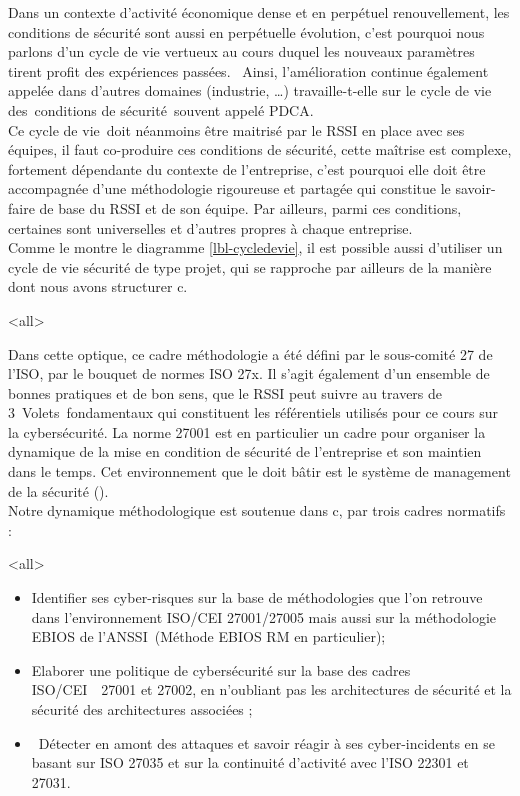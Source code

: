 Dans un contexte d'activité économique dense et en perpétuel renouvellement, les conditions de sécurité sont aussi en perpétuelle évolution, c’est pourquoi nous parlons d'un cycle de vie vertueux au cours duquel les nouveaux paramètres tirent profit des expériences passées.  Ainsi, l’amélioration continue également appelée  dans d’autres domaines (industrie, …) travaille-t-elle sur le cycle de vie des conditions de sécurité souvent appelé \gls{PDCA}.\\
Ce cycle de vie doit néanmoins être maitrisé par le RSSI en place avec ses équipes, il faut co-produire ces conditions de sécurité, cette maîtrise est complexe, fortement dépendante du contexte de l'entreprise, c’est pourquoi elle doit être accompagnée d'une méthodologie rigoureuse et partagée qui constitue le savoir-faire de base du RSSI et de son équipe. Par ailleurs, parmi ces conditions, certaines sont universelles et d’autres propres à chaque entreprise. \\ Comme le montre le diagramme \ref{lbl-cycledevie}, il est possible aussi d’utiliser un cycle de vie sécurité de type projet, qui se rapproche par ailleurs de la manière dont nous avons structurer c\edoc. 

\mode<all>{}


Dans cette optique, ce cadre méthodologie a été défini par le sous-comité 27 de l'ISO, par le bouquet de normes ISO 27x. Il s’agit également d'un ensemble de bonnes pratiques et de bon sens, que le RSSI peut suivre au travers de 3 Volets fondamentaux qui constituent les référentiels utilisés pour ce cours sur la cybersécurité. La norme 27001 est en particulier un cadre pour organiser la dynamique de la mise en condition de sécurité de l’entreprise et son maintien dans le temps. Cet environnement que le  doit bâtir est le système de management de la sécurité ().\\
Notre dynamique méthodologique est soutenue dans  c\edoc, par trois cadres normatifs : 
 
\mode<all>{
{
\begin{itemize}
\item Identifier ses cyber-risques sur la base de méthodologies que l’on retrouve dans l’environnement ISO/CEI 27001/27005 mais aussi sur la méthodologie EBIOS de l’ANSSI (Méthode EBIOS RM en particulier); 
\item Elaborer une politique de cybersécurité sur la base des cadres ISO/CEI  27001 et 27002, en n’oubliant pas les architectures de sécurité et la sécurité des architectures associées ; 
\item Détecter en amont des attaques et savoir réagir à ses cyber-incidents en se basant sur ISO 27035 et sur la continuité d’activité avec l’ISO 22301 et 27031.
\end{itemize}
}} %


